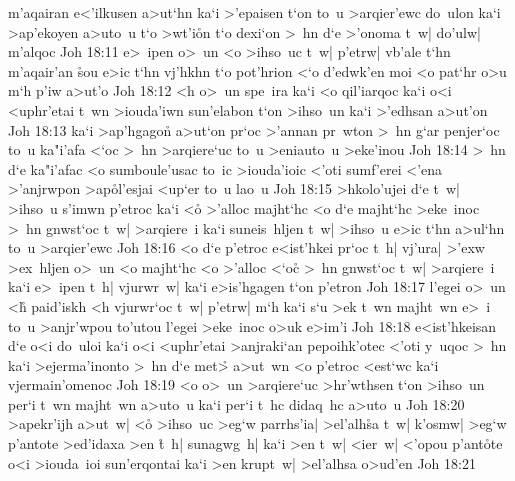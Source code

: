 m'aqairan
e<'ilkusen
a>ut`hn
ka`i
>'epaisen
t`on
to~u
>arqier'ewc
do~ulon
ka`i
>ap'ekoyen
a>uto~u
t`o
>wt'i\r{o}n
t`o
dexi`on
>~hn
d`e
>'onoma
t~w|
do'ulw|
m'alqoc\bibvsend
\vs Joh 18:11
e>~ipen
o>~un
<o
>ihso~uc
t~w|
p'etrw|
vb'ale
t`hn
m'aqair'an
\r{s}ou
e>ic
t`hn
vj'hkhn
t`o
pot'hrion
<`o
d'edwk'en
moi
<o
pat`hr
o>u
m`h
p'iw
a>ut'o\bibvsend
\vs Joh 18:12
<h
o>~un
spe~ira
ka`i
<o
qil'iarqoc
ka`i
o<i
<uphr'etai
t~wn
>iouda'iwn
sun'elabon
t`on
>ihso~un
ka`i
>'edhsan
a>ut'on\bibvsend
\vs Joh 18:13
ka`i
>ap'hgagon\r{}
a>ut`on
pr`oc
>'annan
pr~wton
>~hn
g`ar
penjer`oc
to~u
ka"i'afa
<`oc
>~hn
>arqiere`uc
to~u
>eniauto~u
>eke'inou\bibvsend
\vs Joh 18:14
>~hn
d`e
ka"i'afac
<o
sumboule'usac
to~ic
>iouda'ioic
<'oti
sumf'erei
<'ena
>'anjrwpon
>ap\r{o}l'esjai
<up`er
to~u
lao~u\bibvsend
\vs Joh 18:15
>hkolo'ujei
d`e
t~w|
>ihso~u
s'imwn
p'etroc
ka`i
<o\r{}
>'alloc
majht`hc
<o
d`e
majht`hc
>eke~inoc
>~hn
gnwst`oc
t~w|
>arqiere~i
ka`i
suneis~hljen
t~w|
>ihso~u
e>ic
t`hn
a>ul`hn
to~u
>arqier'ewc\bibvsend
\vs Joh 18:16
<o
d`e
p'etroc
e<ist'hkei
pr`oc
t~h|
vj'ura|
>'exw
>ex~hljen
o>~un
<o
majht`hc
<o
>'alloc
<`oc\r{}
>~hn
gnwst`oc
t~w|
>arqiere~i
ka`i
e>~ipen
t~h|
vjurwr~w|
ka`i
e>is'hgagen
t`on
p'etron\bibvsend
\vs Joh 18:17
l'egei
o>~un
<h\r{}
paid'iskh
<h
vjurwr`oc
t~w|
p'etrw|
m`h
ka`i
s`u
>ek
t~wn
majht~wn
e>~i
to~u
>anjr'wpou
to'utou
l'egei
>eke~inoc
o>uk
e>im'i\bibvsend
\vs Joh 18:18
e<ist'hkeisan
d`e
o<i
do~uloi
ka`i
o<i
<uphr'etai
>anjraki`an
pepoihk'otec
<'oti
y~uqoc
>~hn
ka`i
>ejerma'inonto
>~hn
d`e
met>\r{}
a>ut~wn
<o
p'etroc
<est`wc
ka`i
vjermain'omenoc\bibvsend
\vs Joh 18:19
<o
o>~un
>arqiere`uc
>hr'wthsen
t`on
>ihso~un
per`i
t~wn
majht~wn
a>uto~u
ka`i
per`i
t~hc
didaq~hc
a>uto~u\bibvsend
\vs Joh 18:20
>apekr'ijh
a>ut~w|
<o\r{}
>ihso~uc
>eg`w
parrhs'ia|
>el'alh\r{s}a
t~w|
k'osmw|
>eg`w
p'antote
>ed'idaxa
>en
\r{t}~h|
sunagwg~h|
ka`i
>en
t~w|
<ier~w|
<'opou
p'ant\r{o}te
o<i
>iouda~ioi
sun'erqontai
ka`i
>en
krupt~w|
>el'alhsa
o>ud'en\bibvsend
\vs Joh 18:21
